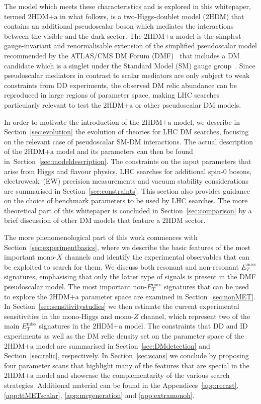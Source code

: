 \documentclass[a4paper, 11pt,notoc]{article}
\newcommand{\MET}{\ensuremath{E_T^\mathrm{miss}}\xspace}
\newcommand{\hdma}{\ensuremath{\textrm{2HDM+a}}\xspace}
\begin{document}
The model which meets these characteristics and is explored in this whitepaper,  termed \hdma in what follows,  is a two-Higgs-doublet model (2HDM) that contains an additional pseudoscalar boson which  mediates the interactions between the visible and the dark sector.  The \hdma model is the simplest gauge-invariant and renormalisable extension of the  simplified pseudoscalar model recommended by the ATLAS/CMS DM Forum (DMF)~\cite{Abercrombie:2015wmb} that  includes a  DM candidate which is a singlet under the Standard Model (SM) gauge group~\cite{Ipek:2014gua,No:2015xqa,Goncalves:2016iyg,Bauer:2017ota,Tunney:2017yfp}.  Since pseudoscalar mediators in contrast to scalar mediators are only subject to weak constraints from DD experiments, the observed DM relic abundance can be reproduced in large regions of parameter space, making LHC searches particularly relevant to test the \hdma or other pseudoscalar DM models.

In order to motivate the introduction of the \hdma model, we describe in Section~\ref{sec:evolution} the evolution of theories for LHC DM searches, focusing on the relevant case of pseudoscalar SM-DM interactions. The actual description of the \hdma model and its parameters can then be found in~Section~\ref{sec:modeldescription}. The constraints on the input parameters that arise from Higgs and flavour physics, LHC searches for additional spin-0 bosons, electroweak~(EW) precision measurements and vacuum stability considerations are summarised in Section~\ref{sec:constraints}. This section also provides guidance on the choice of benchmark parameters to be used by LHC searches. The more theoretical part of this whitepaper is concluded in Section~\ref{sec:comparison} by a brief discussion of other DM models that feature a 2HDM sector. 

The more phenomenological part of this work commences with Section~\ref{sec:experimentbasics}, where we describe the basic features of the most important mono-$X$ channels and identify the experimental observables that can be exploited to search for them. We discuss both resonant and non-resonant $\MET$ signatures, emphasising that only the latter type of signals is present in the DMF pseudoscalar model. The most important non-$\MET$ signatures that can be used to explore the \hdma parameter space  are examined in Section~\ref{sec:nonMET}. In Section~\ref{sec:sensitivitystudies} we then estimate the current experimental sensitivities  in the mono-Higgs and mono-$Z$ channel, which represent two of the main $\MET$ signatures in the \hdma model. The constraints that DD and ID experiments as well as the DM relic density set on the parameter space of the \hdma model are summarised in Section~\ref{sec:DMdetection} and Section~\ref{sec:relic}, respectively. In Section~\ref{sec:scans} we conclude by proposing four parameter scans that highlight many of the features that are special in the \hdma model and showcase the complementarity of the various search strategies.  Additional material can be found in the Appendices~\ref{app:recast}, \ref{app:ttMETscalar}, \ref{app:mcgeneration} and \ref{app:extramonoh}.
\end{document}
